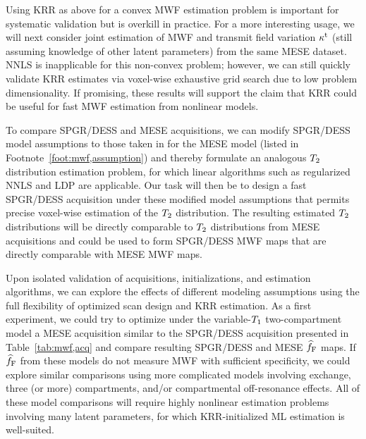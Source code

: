 Using KRR as above
for a convex MWF estimation problem 
is important for systematic validation
but is overkill in practice.
For a more interesting usage,
we will next consider joint estimation
of MWF and transmit field variation $\kappa^{\mathrm{t}}$
(still assuming knowledge of other latent parameters)
from the same MESE dataset.
NNLS is inapplicable 
for this non-convex problem;
however, 
we can still quickly validate KRR estimates 
via voxel-wise exhaustive grid search
due to low problem dimensionality.
If promising,
these results will support the claim
that KRR could be useful 
for fast \invivo MWF estimation 
from nonlinear models.

To compare SPGR/DESS and MESE acquisitions,
we can modify SPGR/DESS model assumptions
to those taken in \cite{prasloski:12:rwc}
for the MESE model
(listed in Footnote~\ref{foot:mwf,assumption})
and thereby formulate an analogous
$T_2$ distribution estimation problem,
for which linear algorithms 
such as regularized NNLS and LDP are applicable.
Our task will then be 
to design a fast SPGR/DESS acquisition
under these modified model assumptions
that permits precise voxel-wise estimation 
of the $T_2$ distribution.
The resulting estimated $T_2$ distributions
will be directly comparable 
to $T_2$ distributions 
from MESE acquisitions
and could be used
to form SPGR/DESS MWF maps
that are directly comparable 
with MESE MWF maps.

Upon isolated validation
of acquisitions, initializations, and estimation algorithms,
we can explore the effects 
of different modeling assumptions
using the full flexibility
of optimized scan design and KRR estimation.
As a first experiment,
we could try to optimize
under the variable-$T_1$ two-compartment model 
a MESE acquisition
similar to the SPGR/DESS acquisition 
presented in Table~\ref{tab:mwf,acq}
and compare resulting SPGR/DESS and MESE $\widehat{f}_{\mathrm{F}}$ maps. 
If $\widehat{f}_{\mathrm{F}}$ from these models do not measure MWF
with sufficient specificity,
we could explore similar comparisons
using more complicated models
involving exchange, three (or more) compartments,
and/or compartmental off-resonance effects.
All of these model comparisons 
will require highly nonlinear estimation problems
involving many latent parameters,
for which KRR-initialized ML estimation is well-suited.

